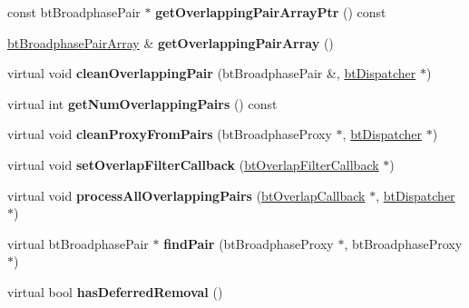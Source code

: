 \begin{DoxyCompactItemize}
const bt\+Broadphase\+Pair $\ast$ {\bfseries get\+Overlapping\+Pair\+Array\+Ptr} () const
\item 
\mbox{\label{classbtNullPairCache_ae5be2cc230e27881fd04fe1da320c7fe}} 
\hyperlink{classbtAlignedObjectArray}{bt\+Broadphase\+Pair\+Array} \& {\bfseries get\+Overlapping\+Pair\+Array} ()
\item 
\mbox{\label{classbtNullPairCache_a20b534e589edacd12ddf52124535c2cc}} 
virtual void {\bfseries clean\+Overlapping\+Pair} (bt\+Broadphase\+Pair \&, \hyperlink{classbtDispatcher}{bt\+Dispatcher} $\ast$)
\item 
\mbox{\label{classbtNullPairCache_a76aa3a3bf39a8758310c55ef183ae80d}} 
virtual int {\bfseries get\+Num\+Overlapping\+Pairs} () const
\item 
\mbox{\label{classbtNullPairCache_ae8dd727539fe9ca3d6380557a925cd1f}} 
virtual void {\bfseries clean\+Proxy\+From\+Pairs} (bt\+Broadphase\+Proxy $\ast$, \hyperlink{classbtDispatcher}{bt\+Dispatcher} $\ast$)
\item 
\mbox{\label{classbtNullPairCache_a5c1cb3394936c0fddddb19a3be8241a3}} 
virtual void {\bfseries set\+Overlap\+Filter\+Callback} (\hyperlink{structbtOverlapFilterCallback}{bt\+Overlap\+Filter\+Callback} $\ast$)
\item 
\mbox{\label{classbtNullPairCache_a39c6b95bf7412b8f37dba2efa633ce09}} 
virtual void {\bfseries process\+All\+Overlapping\+Pairs} (\hyperlink{structbtOverlapCallback}{bt\+Overlap\+Callback} $\ast$, \hyperlink{classbtDispatcher}{bt\+Dispatcher} $\ast$)
\item 
\mbox{\label{classbtNullPairCache_a1932ebc5d729f0f31528f7647b1c0ab9}} 
virtual bt\+Broadphase\+Pair $\ast$ {\bfseries find\+Pair} (bt\+Broadphase\+Proxy $\ast$, bt\+Broadphase\+Proxy $\ast$)
\item 
\mbox{\label{classbtNullPairCache_a937a29216d8c7585d8c710f84745bd1b}} 
virtual bool {\bfseries has\+Deferred\+Removal} ()
\item 
\mbox{\label{classbtNullPairCache_a5cb33e9d3694c71fe68038580da8cc69}} 

\end{DoxyCompactItemize}
